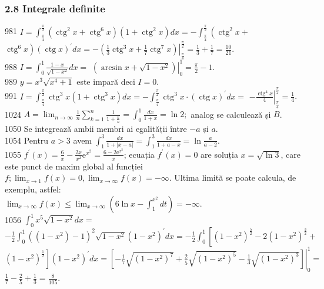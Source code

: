 \documentclass[11pt]{article}
\begin{document}
\subsubsection*{2.8 Integrale definite}
981 $I=\int_{\frac{\pi}{4}}^{\frac{\pi}{2}}\left(\operatorname{ctg}^{2} x+\operatorname{ctg}^{6} x\right)\left(1+\operatorname{ctg}^{2} x\right) d x=-\int_{\frac{\pi}{4}}^{\frac{\pi}{2}}\left(\operatorname{ctg}^{2} x+\right.$ $\left.\operatorname{ctg}^{6} x\right)(\operatorname{ctg} x)^{\prime} d x=-\left.\left(\frac{1}{3} \operatorname{ctg}^{3} x+\frac{1}{7} \operatorname{ctg}^{7} x\right)\right|_{\frac{\pi}{4}} ^{\frac{\pi}{2}}=\frac{1}{3}+\frac{1}{7}=\frac{10}{21}$.\\
988 $I=\int_{0}^{1} \frac{1-x}{\sqrt{1-x^{2}}} d x=$ $\left.\left(\arcsin x+\sqrt{1-x^{2}}\right)\right|_{0} ^{1}=\frac{\pi}{2}-1$.\\
989 $y=x^{3} \sqrt{x^{4}+1}$ este impară deci $I=0$.\\
991 $I=\int_{\frac{\pi}{4}}^{\frac{\pi}{2}} \operatorname{ctg}^{3} x\left(1+\operatorname{ctg}^{3} x\right) d x=-\int_{\frac{\pi}{4}}^{\frac{\pi}{2}} \operatorname{ctg}^{3} x \cdot(\operatorname{ctg} x)^{\prime} d x=$ $-\left.\frac{\operatorname{ctg}^{4} x}{4}\right|_{\frac{\pi}{4}} ^{\frac{\pi}{2}}=\frac{1}{4}$.\\
1024 $A=\lim _{n \rightarrow \infty} \frac{1}{n} \sum_{k=1}^{n} \frac{1}{1+\frac{k}{n}}=\int_{0}^{1} \frac{d x}{1+x}=\ln 2 ;$ analog se calculează și $B$.\\
1050 Se integrează ambii membri ai egalității între $-a$ și $a$.\\
1054 Pentru $a>3$ avem $\int_{1}^{3} \frac{d x}{1+|x-a|}=\int_{1}^{3} \frac{d x}{1+a-x}=\ln \frac{a}{a-2}$.\\
1055 $f^{\prime}(x)=\frac{6}{x}-\frac{2 x}{x^{2}} \mathrm{e}^{x^{2}}=\frac{6-2 \mathrm{e}^{x^{2}}}{x}$; ecuația $f^{\prime}(x)=0$ are soluția $x=\sqrt{\ln 3}$, care este punct de maxim global al funcției $f ; \lim _{x \rightarrow 1} f(x)=0, \lim _{x \rightarrow \infty} f(x)=-\infty$. Ultima limită se poate calcula, de exemplu, astfel:\\$\left.\lim _{x \rightarrow \infty} f(x) \leq \lim _{x \rightarrow \infty}\left(6 \ln x-\int_{1}^{x^{2}} d t\right)=-\infty\right.$.\\
1056 $\int_{0}^{1} x^{5} \sqrt{1-x^{2}} d x=$\\$-\frac{1}{2} \int_{0}^{1}\left(\left(1-x^{2}\right)-1\right)^{2} \sqrt{1-x^{2}}\left(1-x^{2}\right)^{\prime} d x=-\frac{1}{2} \int_{0}^{1}\left[\left(1-x^{2}\right)^{\frac{5}{2}}-2\left(1-x^{2}\right)^{\frac{3}{2}}+\right.$ $\left.\left(1-x^{2}\right)^{\frac{1}{2}}\right]\left(1-x^{2}\right)^{\prime} d x=\left.\left[-\frac{1}{7} \sqrt{\left(1-x^{2}\right)^{7}}+\frac{2}{5} \sqrt{\left(1-x^{2}\right)^{5}}-\frac{1}{3} \sqrt{\left(1-x^{2}\right)^{3}}\right]\right|_{0} ^{1}=$ $\frac{1}{7}-\frac{2}{5}+\frac{1}{3}=\frac{8}{105}$.\\
\end{document}
